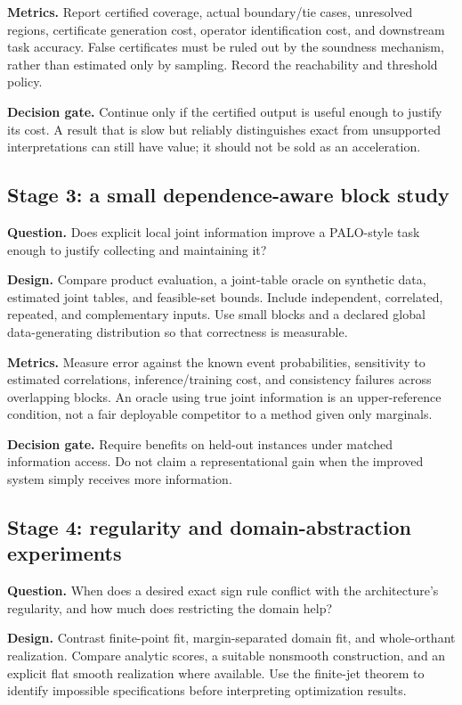 \documentclass[11pt,a4paper]{article}
\theoremstyle{remark}
\begin{document}
\textbf{Metrics.} Report certified coverage, actual boundary/tie cases, unresolved regions, certificate generation cost, operator identification cost, and downstream task accuracy. False certificates must be ruled out by the soundness mechanism, rather than estimated only by sampling. Record the reachability and threshold policy.

\textbf{Decision gate.} Continue only if the certified output is useful enough to justify its cost. A result that is slow but reliably distinguishes exact from unsupported interpretations can still have value; it should not be sold as an acceleration.

\subsection{Stage 3: a small dependence-aware block study}
\textbf{Question.} Does explicit local joint information improve a PALO-style task enough to justify collecting and maintaining it?

\textbf{Design.} Compare product evaluation, a joint-table oracle on synthetic data, estimated joint tables, and feasible-set bounds. Include independent, correlated, repeated, and complementary inputs. Use small blocks and a declared global data-generating distribution so that correctness is measurable.

\textbf{Metrics.} Measure error against the known event probabilities, sensitivity to estimated correlations, inference/training cost, and consistency failures across overlapping blocks. An oracle using true joint information is an upper-reference condition, not a fair deployable competitor to a method given only marginals.

\textbf{Decision gate.} Require benefits on held-out instances under matched information access. Do not claim a representational gain when the improved system simply receives more information.

\subsection{Stage 4: regularity and domain-abstraction experiments}
\textbf{Question.} When does a desired exact sign rule conflict with the architecture's regularity, and how much does restricting the domain help?

\textbf{Design.} Contrast finite-point fit, margin-separated domain fit, and whole-orthant realization. Compare analytic scores, a suitable nonsmooth construction, and an explicit flat smooth realization where available. Use the finite-jet theorem to identify impossible specifications before interpreting optimization results.
\end{document}

